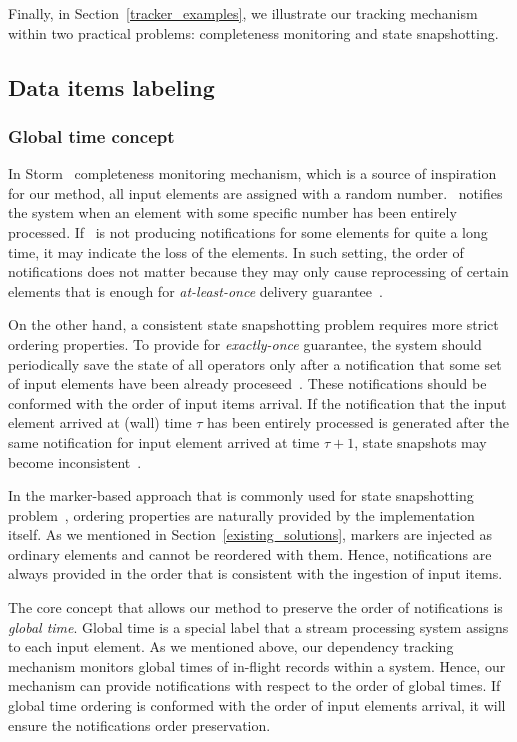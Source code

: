 Finally, in Section~\ref{tracker_examples}, we illustrate our tracking mechanism within two practical problems: completeness monitoring and state snapshotting.

\subsection{Data items labeling} \label{labeling}

\subsubsection{Global time concept} \label{fs-acker-gt}

In Storm \acker\ completeness monitoring mechanism, which is a source of inspiration for our method, all input elements are assigned with a random number. \acker\ notifies the system when an element with some specific number has been entirely processed. If \acker\ is not producing notifications for some elements for quite a long time, it may indicate the loss of the elements. In such setting, the order of notifications does not matter because they may only cause reprocessing of certain elements that is enough for {\em at-least-once} delivery guarantee~\cite{Toshniwal:2014:STO:2588555.2595641}.

On the other hand, a consistent state snapshotting problem requires more strict ordering properties. To provide for {\em exactly-once} guarantee, the system should periodically save the state of all operators only after a notification that some set of input elements have been already proceseed~\cite{thepaper}. These notifications should be conformed with the order of input items arrival. If the notification that the input element arrived at (wall) time $\tau$ has been entirely processed is generated after the same notification for input element arrived at time $\tau + 1$, state snapshots may become inconsistent~\cite{2015arXiv150608603C}.

In the marker-based approach that is commonly used for state snapshotting problem~\cite{Carbone:2017:SMA:3137765.3137777}, ordering properties are naturally provided by the implementation itself. As we mentioned in Section~\ref{existing_solutions}, markers are injected as ordinary elements and cannot be reordered with them. Hence, notifications are always provided in the order that is consistent with the ingestion of input items.

The core concept that allows our method to preserve the order of notifications is \textit{global time}. Global time is a special label that a stream processing system assigns to each input element. As we mentioned above, our dependency tracking mechanism monitors global times of in-flight records within a system. Hence, our mechanism can provide notifications with respect to the order of global times. If global time ordering is conformed with the order of input elements arrival, it will ensure the notifications order preservation.

